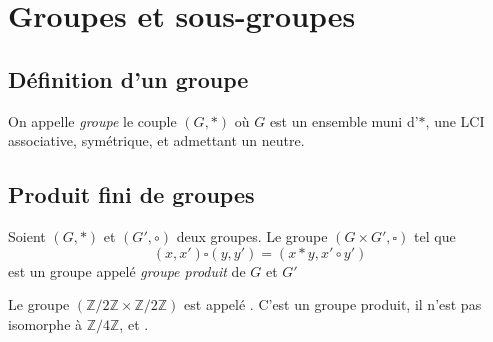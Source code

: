 \documentclass[11pt,a4paper,fleqn,pdftex]{report}
\begin{document}
\chapter{Groupes et sous-groupes}
\section{Définition d'un groupe} %
\label{sec:definition_d_un_groupe}
\begin{dfn}[Groupe]
     On appelle \emph{groupe} le couple $(G,*)$ où $G$ est un ensemble muni d'$*$, une \gls{LCI} associative, symétrique, et admettant un neutre.
\end{dfn}
\section{Produit fini de groupes} %
\label{sec:produit_fini_de_groupes}
\begin{dfn}
     Soient $(G,*)$ et $(G',\circ)$ deux groupes. \newline
     Le groupe $\left( G\times G', \square \right)$ tel que
     \[
         (x,x')\square (y,y') = (x*y,x'\circ y')
     \]
     est un groupe appelé \emph{groupe produit} de $G$ et $G'$
\end{dfn}
\begin{exemple}\label{ex:groupe_de_klein}
     Le groupe $(\mathbb{Z}/2\mathbb{Z} \times \mathbb{Z}/2\mathbb{Z})$ est appelé . C'est un groupe produit, il n'est pas isomorphe à $\mathbb{Z}/4\mathbb{Z}$, et . 
\end{exemple}
\end{document}
